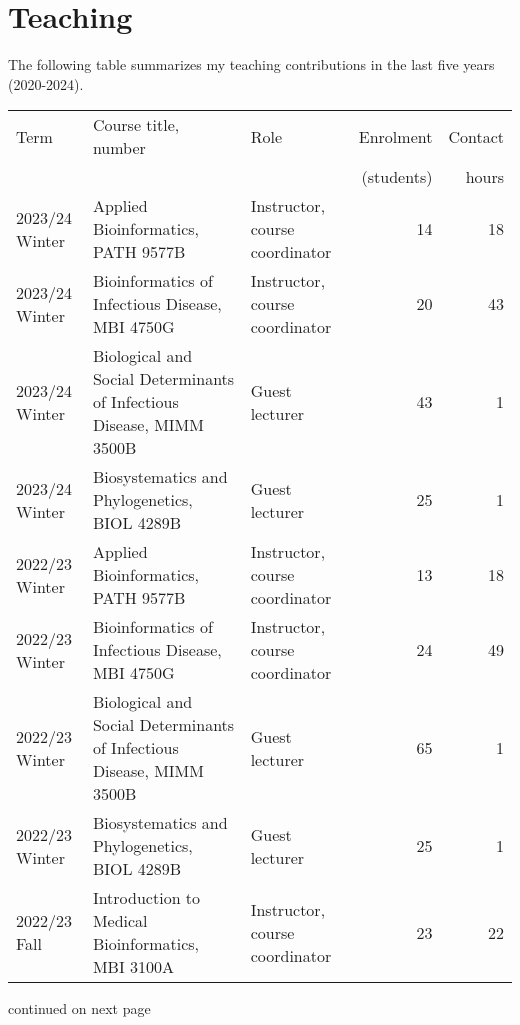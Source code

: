 

\section{Teaching}

The following table summarizes my teaching contributions in the last five years (2020-2024).\\


\bgroup
\setlength{\tabcolsep}{6pt}
\def\arraystretch{1.3}%
\begin{tabular}{lp{2.35in}p{1.2in}rr}
Term & Course title, number & Role & Enrolment & Contact\\[-3pt]
  &  &  &  (students) & hours \\
\hline

2023/24 Winter & Applied Bioinformatics, PATH 9577B & Instructor, course coordinator & 14 & 18\\
2023/24 Winter & Bioinformatics of Infectious Disease, MBI 4750G & Instructor, course coordinator & 20 & 43\\ 
2023/24 Winter & Biological and Social Determinants of Infectious Disease, MIMM 3500B & Guest lecturer & 43 & 1\\
2023/24 Winter & Biosystematics and Phylogenetics, BIOL 4289B & Guest lecturer & 25 & 1\\

2022/23 Winter & Applied Bioinformatics, PATH 9577B & Instructor, course coordinator & 13 & 18\\
2022/23 Winter & Bioinformatics of Infectious Disease, MBI 4750G & Instructor, course coordinator & 24 & 49\\
2022/23 Winter & Biological and Social Determinants of Infectious Disease, MIMM 3500B & Guest lecturer & 65 & 1\\
2022/23 Winter & Biosystematics and Phylogenetics, BIOL 4289B & Guest lecturer & 25 & 1\\
2022/23 Fall & Introduction to Medical Bioinformatics, MBI 3100A & Instructor, course coordinator & 23 & 22\\




\hline

\end{tabular}
\egroup

continued on next page


